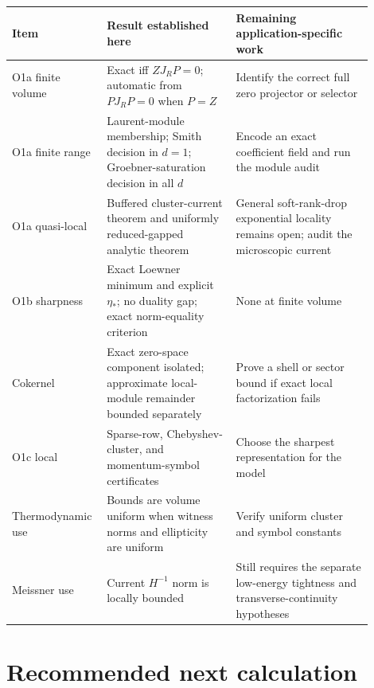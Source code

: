 \documentclass[11pt]{article}
\theoremstyle{definition}
\theoremstyle{remark}
\begin{document}
\begin{center}
\small
\begin{tabular}{p{0.20\linewidth}p{0.34\linewidth}p{0.36\linewidth}}
\toprule
Item & Result established here & Remaining application-specific work\\
\midrule
O1a finite volume & Exact iff $ZJ_RP=0$; automatic from $PJ_RP=0$ when $P=Z$ & Identify the correct full zero projector or selector\\
O1a finite range & Laurent-module membership; Smith decision in $d=1$; Groebner-saturation decision in all $d$ & Encode an exact coefficient field and run the module audit\\
O1a quasi-local & Buffered cluster-current theorem and uniformly reduced-gapped analytic theorem & General soft-rank-drop exponential locality remains open; audit the microscopic current\\
O1b sharpness & Exact Loewner minimum and explicit $\eta_*$; no duality gap; exact norm-equality criterion & None at finite volume\\
Cokernel & Exact zero-space component isolated; approximate local-module remainder bounded separately & Prove a shell or sector bound if exact local factorization fails\\
O1c local & Sparse-row, Chebyshev-cluster, and momentum-symbol certificates & Choose the sharpest representation for the model\\
Thermodynamic use & Bounds are volume uniform when witness norms and ellipticity are uniform & Verify uniform cluster and symbol constants\\
Meissner use & Current $H^{-1}$ norm is locally bounded & Still requires the separate low-energy tightness and transverse-continuity hypotheses\\
\bottomrule
\end{tabular}
\end{center}

\section{Recommended next calculation}
\end{document}
